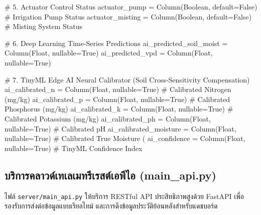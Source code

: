 \begin{pythonbox}
    # 5. Actuator Control Status
    actuator_pump = Column(Boolean, default=False)    # Irrigation Pump Status
    actuator_misting = Column(Boolean, default=False) # Misting System Status

    # 6. Deep Learning Time-Series Predictions
    ai_predicted_soil_moist = Column(Float, nullable=True)
    ai_predicted_vpd = Column(Float, nullable=True)

    # 7. TinyML Edge AI Neural Calibrator (Soil Cross-Sensitivity Compensation)
    ai_calibrated_n = Column(Float, nullable=True)         # Calibrated Nitrogen (mg/kg)
    ai_calibrated_p = Column(Float, nullable=True)         # Calibrated Phosphorus (mg/kg)
    ai_calibrated_k = Column(Float, nullable=True)         # Calibrated Potassium (mg/kg)
    ai_calibrated_ph = Column(Float, nullable=True)        # Calibrated pH
    ai_calibrated_moisture = Column(Float, nullable=True)  # Calibrated True Moisture (%
    ai_confidence = Column(Float, nullable=True)           # TinyML Confidence Index
\end{pythonbox}

\newpage
\subsection{บริการคลาวด์เทเลเมทรีเรสต์เอพีไอ (main\_api.py)}
ไฟล์ \texttt{server/main\_api.py} ให้บริการ RESTful API ประสิทธิภาพสูงด้วย FastAPI เพื่อรองรับการส่งต่อข้อมูลแบบเรียลไทม์ และการดึงข้อมูลประวัติย้อนหลังสำหรับแดชบอร์ด

